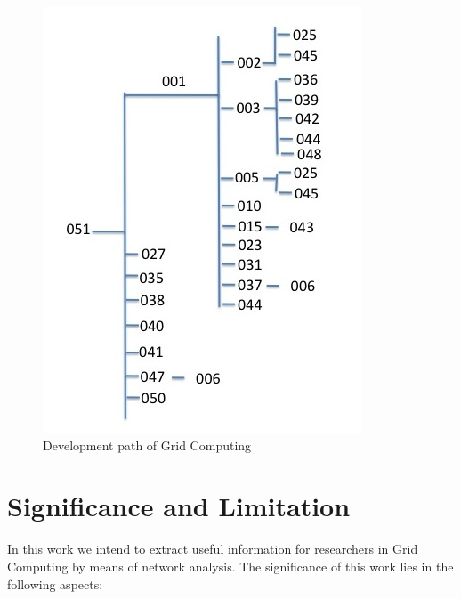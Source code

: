 \begin{figure}[ht!]
\includegraphics [totalheight=0.5\textheight]{images/structure.jpg}
\caption {Development path of Grid Computing}
\label {F:graph}
\end{figure}

\section{Significance and Limitation \label{S:Significance} }

In this work we intend to extract useful information for researchers in Grid Computing by means of network analysis. The significance of this work lies in the following aspects:

